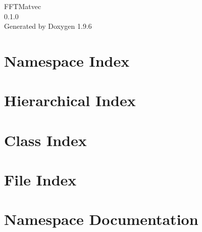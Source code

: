 \documentclass[twoside]{book}
\newcommand{\+}{\discretionary{\mbox{\scriptsize$\hookleftarrow$}}{}{}}
\newcommand{\clearemptydoublepage}{%
    \newpage{\pagestyle{empty}\cleardoublepage}%
  }
\begin{document}
  \raggedbottom
    \hypersetup{pageanchor=false,
                bookmarksnumbered=true,
                pdfencoding=unicode
               }
  \begin{titlepage}
  \vspace*{7cm}
  \begin{center}%
  {\Large FFTMatvec}\\
  [1ex]\large 0.\+1.\+0 \\
  \vspace*{1cm}
  {\large Generated by Doxygen 1.9.6}\\
  \end{center}
  \end{titlepage}
  \clearemptydoublepage
  \tableofcontents
  \clearemptydoublepage
  \hypersetup{pageanchor=true}
\chapter{Namespace Index}

\chapter{Hierarchical Index}

\chapter{Class Index}

\chapter{File Index}

\chapter{Namespace Documentation}


\end{document}
